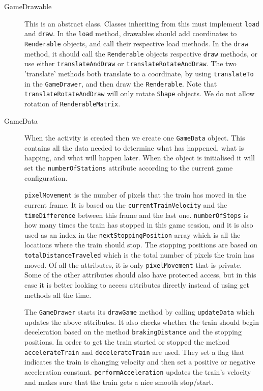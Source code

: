 \begin{description}
\item[GameDrawable] This is an abstract class. Classes inheriting from this must implement \lstinline|load| and \lstinline|draw|. In the \lstinline|load| method, drawables should add coordinates to \lstinline|Renderable| objects, and call their respective load methods. In the \lstinline|draw| method, it should call the \lstinline|Renderable| objects respective \lstinline|draw| methods, or use either \lstinline|translateAndDraw| or \lstinline|translateRotateAndDraw|. The two 'translate' methods both translate to a coordinate, by using \lstinline|translateTo| in the \lstinline|GameDrawer|, and then draw the \lstinline|Renderable|. Note that \lstinline|translateRotateAndDraw| will only rotate \lstinline|Shape| objects. We do not allow rotation of \lstinline|RenderableMatrix|.

\item[GameData] When the activity is created then we create one \lstinline|GameData| object. This contains all the data needed to determine what has happened, what is happing, and what will happen later. When the object is initialised it will set the \lstinline|numberOfStations| attribute according to the current game configuration.

\lstinline|pixelMovement| is the number of pixels that the train has moved in the current frame. It is based on the \lstinline|currentTrainVelocity| and the \lstinline|timeDifference| between this frame and the last one. \lstinline|numberOfStops| is how many times the train has stopped in this game session, and it is also used as an index in the \lstinline|nextStoppingPosition| array which is all the locations where the train should stop. The stopping positions are based on \lstinline|totalDistanceTraveled| which is the total number of pixels the train has moved. Of all the attributes, it is only \lstinline|pixelMovement| that is private. Some of the other attributes should also have protected access, but in this case it is better looking to access attributes directly instead of using get methods all the time.

The \lstinline|GameDrawer| starts its \lstinline|drawGame| method by calling \lstinline|updateData| which updates the above attributes. It also checks whether the train should begin deceleration based on the method \lstinline|brakingDistance| and the stopping positions. In order to get the train started or stopped the method \lstinline|accelerateTrain| and \lstinline|decelerateTrain| are used. They set a flag that indicates the train is changing velocity and then set a positive or negative acceleration constant. \lstinline|performAcceleration| updates the train's velocity and makes sure that the train gets a nice smooth stop/start.


\end{description}
